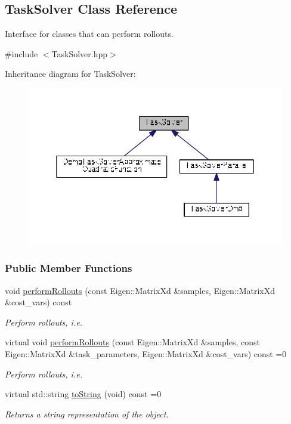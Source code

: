 \hypertarget{classDmpBbo_1_1TaskSolver}{\subsection{Task\+Solver Class Reference}
\label{classDmpBbo_1_1TaskSolver}
}


Interface for classes that can perform rollouts.  




{\ttfamily \#include $<$Task\+Solver.\+hpp$>$}



Inheritance diagram for Task\+Solver\+:
\nopagebreak
\begin{figure}[H]
\begin{center}
\leavevmode
\includegraphics[width=350pt]{classDmpBbo_1_1TaskSolver__inherit__graph}
\end{center}
\end{figure}
\subsubsection*{Public Member Functions}
\begin{DoxyCompactItemize}
\item 
void \hyperlink{classDmpBbo_1_1TaskSolver_aea5c8e55f828886dae52bacf466dc707}{perform\+Rollouts} (const Eigen\+::\+Matrix\+Xd \&samples, Eigen\+::\+Matrix\+Xd \&cost\+\_\+vars) const 
\begin{DoxyCompactList}\small\item\em Perform rollouts, i.\+e. \end{DoxyCompactList}\item 
virtual void \hyperlink{classDmpBbo_1_1TaskSolver_a36d1f440face2e087122666173020bb1}{perform\+Rollouts} (const Eigen\+::\+Matrix\+Xd \&samples, const Eigen\+::\+Matrix\+Xd \&task\+\_\+parameters, Eigen\+::\+Matrix\+Xd \&cost\+\_\+vars) const =0
\begin{DoxyCompactList}\small\item\em Perform rollouts, i.\+e. \end{DoxyCompactList}\item 
virtual std\+::string \hyperlink{classDmpBbo_1_1TaskSolver_af084bff2ddd6233e9a898faa23f6195c}{to\+String} (void) const =0
\begin{DoxyCompactList}\small\item\em Returns a string representation of the object. \end{DoxyCompactList}\end{DoxyCompactItemize}
